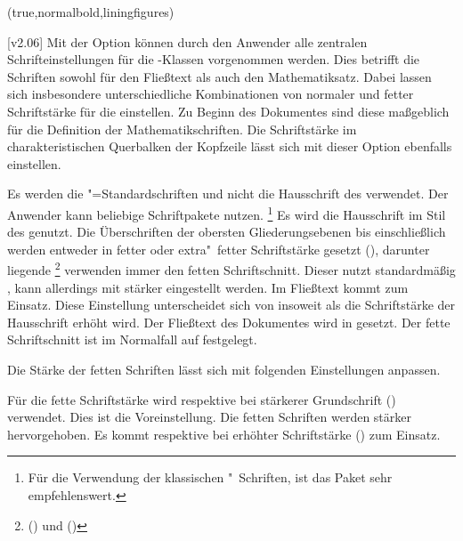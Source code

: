 \begin{DeclareEntity*}{}
\begin{DeclareEntity*}{}
\begin{DeclareEntity*}{}
\begin{Declaration}
  {}
  (true,normalbold,liningfigures)
\printdeclarationlist

[v2.06]%
Mit der Option  können durch den Anwender alle zentralen 
Schrifteinstellungen für die \TUDScript-Klassen vorgenommen werden. Dies 
betrifft die Schriften sowohl für den Fließtext als auch den Mathematiksatz.
Dabei lassen sich insbesondere unterschiedliche Kombinationen von normaler und 
fetter Schriftstärke für die \OpenSans einstellen. Zu Beginn des Dokumentes 
sind diese maßgeblich für die Definition der Mathematikschriften. Die 
Schriftstärke im charakteristischen Querbalken der Kopfzeile lässt sich mit 
dieser Option ebenfalls einstellen.
\begin{DeclareValues}
  Es werden die "=Standardschriften und nicht die Hausschrift 
  des \CDs verwendet. Der Anwender kann beliebige Schriftpakete nutzen.%
  \footnote{%
    Für die Verwendung der klassischen "~Schriften, ist das Paket 
     sehr empfehlenswert.%
  }
  Es wird die Hausschrift \OpenSans im Stil des \CDs genutzt. Die Überschriften 
  der obersten Gliederungsebenen bis einschließlich  
  werden entweder in fetter oder extra"~fetter Schriftstärke gesetzt 
  (), darunter liegende%
  \footnote{%
    () und 
    ()%
  } verwenden immer den fetten Schriftschnitt. Dieser nutzt standardmäßig 
  , kann allerdings mit  
  stärker eingestellt werden. Im Fließtext kommt  zum 
  Einsatz.
  Diese Einstellung unterscheidet sich von  insoweit als 
  die Schriftstärke der Hausschrift erhöht wird. Der Fließtext des Dokumentes 
  wird in  gesetzt. Der fette Schriftschnitt ist im 
  Normalfall auf  festgelegt.
\end{DeclareValues}

Die Stärke der fetten Schriften lässt sich mit folgenden Einstellungen anpassen.
\begin{DeclareValues}
  Für die fette Schriftstärke wird  respektive bei 
  stärkerer Grundschrift () 
  verwendet. Dies ist die Voreinstellung.
  Die fetten Schriften werden stärker hervorgehoben. Es kommt 
   respektive  bei 
  erhöhter Schriftstärke () zum Einsatz.
\end{DeclareValues}


\end{Declaration}
\end{DeclareEntity*}
\end{DeclareEntity*}
\end{DeclareEntity*}
